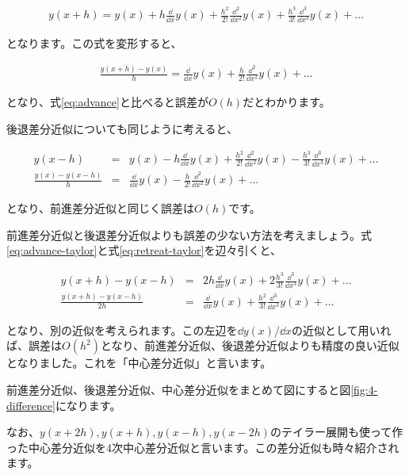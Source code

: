 \begin{eqnarray}
    \label{eq:advance-taylor}
    y(x+h)=y(x)+h\frac{\dd}{\dd x}y(x)+\frac{h^2}{2!}\frac{\dd^2}{\dd x^2}y(x)+\frac{h^3}{3!}\frac{\dd^3}{\dd x^3}y(x)+\dots
\end{eqnarray}

\noindent
となります。この式を変形すると、

\begin{eqnarray}
    \frac{y(x+h)-y(x)}{h}=\frac{\dd}{\dd x}y(x)+\frac{h}{2!}\frac{\dd^2}{\dd x^2}y(x)+\dots
\end{eqnarray}

\noindent
となり、式\ref{eq:advance}と比べると誤差が$O(h)$だとわかります。

後退差分近似についても同じように考えると、

\begin{eqnarray}
    \label{eq:retreat-taylor}
    y(x-h)&=&y(x)-h\frac{\dd}{\dd x}y(x)+\frac{h^2}{2!}\frac{\dd^2}{\dd x^2}y(x)-\frac{h^3}{3!}\frac{\dd^3}{\dd x^3}y(x)+\dots \\
    \frac{y(x)-y(x-h)}{h}&=&\frac{\dd}{\dd x}y(x)-\frac{h}{2!}\frac{\dd^2}{\dd x^2}y(x)+\dots
\end{eqnarray}

\noindent
となり、前進差分近似と同じく誤差は$O(h)$です。

前進差分近似と後退差分近似よりも誤差の少ない方法を考えましょう。式\ref{eq:advance-taylor}と式\ref{eq:retreat-taylor}を辺々引くと、

\begin{eqnarray}
    y(x+h)-y(x-h)&=&2h\frac{\dd}{\dd x}y(x)+2\frac{h^3}{3!}\frac{\dd^3}{\dd x^3}y(x)+\dots \\
    \frac{y(x+h)-y(x-h)}{2h}&=&\frac{\dd}{\dd x}y(x)+\frac{h^2}{3!}\frac{\dd^3}{\dd x^3}y(x)+\dots
\end{eqnarray}

\noindent
となり、別の近似を考えられます。この左辺を$\dd y(x)/\dd x$の近似として用いれば、誤差は$O(h^2)$となり、前進差分近似、後退差分近似よりも精度の良い近似となりました。これを「中心差分近似」と言います。

前進差分近似、後退差分近似、中心差分近似をまとめて図にすると図\ref{fig:4-difference}になります。

なお、$y(x+2h),y(x+h),y(x-h),y(x-2h)$のテイラー展開も使って作った中心差分近似を4次中心差分近似と言います。この差分近似も時々紹介されます。

